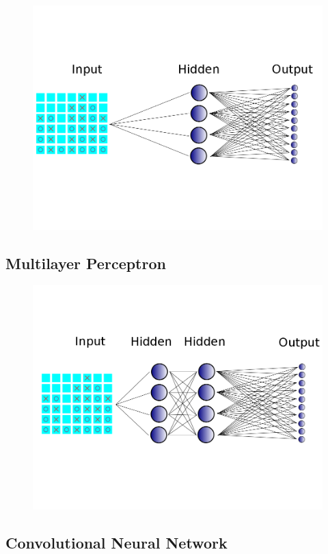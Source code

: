 \begin{frame}
\begin{figure}
\includegraphics[width=0.8 \textwidth]{"simple neural net all lines"}
\end{figure}
\end{frame}

\subsection{Multilayer Perceptron}

\begin{frame}
\begin{figure}
\includegraphics[width=0.8 \textwidth]{"mlp all lines"}
\end{figure}
\end{frame}

\subsection{Convolutional Neural Network}


